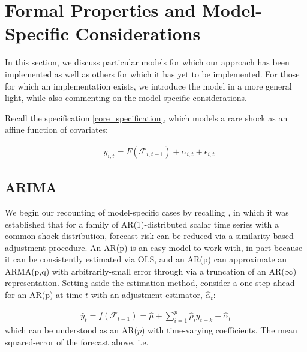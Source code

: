 \documentclass[11pt]{article}
\theoremstyle{definition}
\begin{document}
\section{Formal Properties and Model-Specific Considerations}\label{special_cases}

In this section, we discuss particular models for which our approach has been implemented as well as others for which it has yet to be implemented.  For those for which an implementation exists, we introduce the model in a more general light, while also commenting on the model-specific considerations.

Recall the specification \ref{core_specification}, which models a rare shock as an affine function of covariates:

\begin{align*}
  &y_{i,t} = F(\mathcal{F}_{i,t-1}) + \alpha_{i,t} + \epsilon_{i,t}
\end{align*}

\subsection{ARIMA}\label{ARIMA}
We begin our recounting of model-specific cases by recalling \cite{lin2021minimizing}, in which it was established that for a family of AR(1)-distributed scalar time series with a common shock distribution, forecast risk can be reduced via a similarity-based adjustment procedure.  An AR(p) is an easy model to work with, in part because it can be consistently estimated via OLS, and an AR(p) can approximate an ARMA(p,q) with arbitrarily-small error through via a truncation of an AR($\infty$) representation.  Setting aside the estimation method, consider a one-step-ahead for an AR(p) at time $t$ with an adjustment estimator, $\hat\alpha_{t}$:

\begin{align}
\hat{y}_{t} = f(\mathcal{F}_{t-1}) = \hat\mu + \sum^{p}_{i=1}\hat\rho_{i}y_{t-k} + \hat{\alpha}_{t}
\end{align}
which can be understood as an AR($p$) with time-varying coefficients.  The mean squared-error of the forecast above, i.e.
\end{document}
